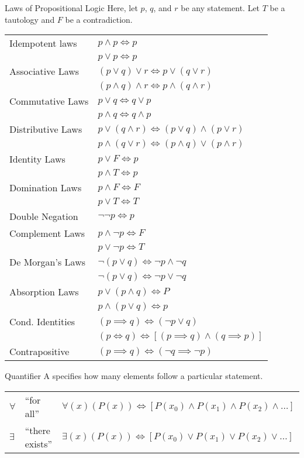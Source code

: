 \documentclass[letterpaper,12pt]{report}
\begin{document}
\begin{genbox}{Laws of Propositional Logic}
Here, let $p$, $q$, and $r$ be any statement. Let $T$ be a tautology and $F$ be a contradiction.

\begin{tabular}{|l|l|} \hline
	Idempotent laws & $p \land p \iff p$ \\ & $p \lor p \iff p$ \\ \hline
	Associative Laws & $(p \lor q) \lor r \iff p \lor (q \lor r)$ \\ & $(p \land q) \land r \iff p \land (q \land r)$ \\ \hline
	Commutative Laws & $p \lor q \iff q \lor p$ \\ & $p \land q \iff q \land p$ \\ \hline
	Distributive Laws & $p \lor (q \land r) \iff (p \lor q) \land (p \lor r)$ \\ & $p \land (q \lor r) \iff (p \land q) \lor (p \land r)$ \\ \hline
	Identity Laws & $p \lor F \iff p$ \\ & $p \land T \iff p$ \\ \hline
	Domination Laws & $p \land F \iff F$ \\ & $p \lor T \iff T$ \\ \hline
	Double Negation & $\neg \neg p \iff p$ \\ \hline
	Complement Laws & $p \land \neg p \iff F$ \\ & $p \lor \neg p \iff T$ \\ \hline
	De Morgan's Laws & $\neg (p \lor q) \iff \neg p \land \neg q$ \\ & $\neg (p \lor q) \iff \neg p \lor \neg q$ \\ \hline
	Absorption Laws & $p \lor (p \land q) \iff P$ \\ & $p \land (p \lor q) \iff p$ \\ \hline
	Cond. Identities & $(p \implies q) \iff (\neg p \lor q)$ \\ & $(p \iff q) \iff \left[ (p \implies q) \land (q \implies p) \right]$ \\ \hline
	Contrapositive & $(p \implies q) \iff (\neg q \implies \neg p)$ \\ \hline
\end{tabular}

\end{genbox}

\begin{dfnbox}{Quantifier}{}
    A  specifies how many elements follow a particular statement.
	\tcblower
	\begin{center}\begin{tabular}{lll}
		$\forall$ & ``for all'' & $\forall (x)(P(x)) \iff \left[ P(x_0) \land P(x_1) \land P(x_2) \land \ldots \right]$ \\
		$\exists$ & ``there exists'' & $\exists (x)(P(x)) \iff \left[ P(x_0) \lor P(x_1) \lor P(x_2) \lor \ldots \right]$ \\
	\end{tabular}\end{center}
\end{dfnbox}
\end{document}
